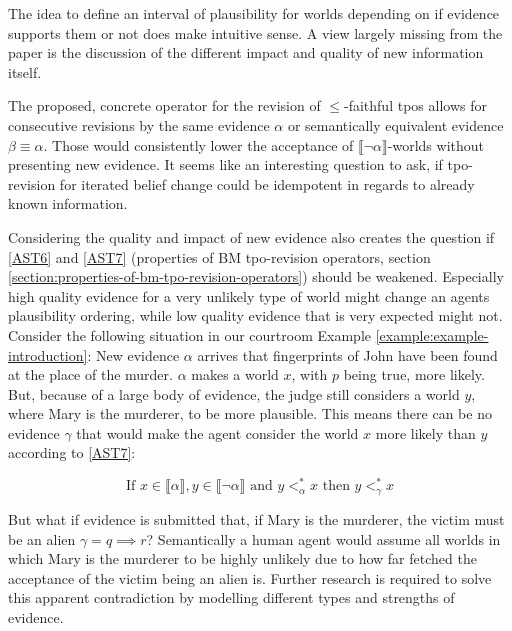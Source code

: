 \documentclass[english, 12pt]{scrartcl}
\theoremstyle{definition}
\theoremstyle{definition}
\theoremstyle{definition}
\newcommand{\modelsOf}[1]{\llbracket #1 \rrbracket}
\begin{document}
The idea to define an interval of plausibility for worlds depending on if evidence supports them or not does make intuitive sense. A view largely missing from the paper is the discussion of the different impact and quality of new information itself.

The proposed, concrete operator for the revision of $\leq$-faithful tpos allows for consecutive revisions by the same evidence $\alpha$ or semantically equivalent evidence $\beta \equiv \alpha$. Those would consistently lower the acceptance of $\modelsOf{\neg\alpha}$-worlds without presenting new evidence. It seems like an interesting question to ask, if tpo-revision for iterated belief change could be idempotent in regards to already known information.

Considering the quality and impact of new evidence also creates the question if \ref{AST6} and \ref{AST7} (properties of BM tpo-revision operators, section \ref{section:properties-of-bm-tpo-revision-operators}) should be weakened. Especially high quality evidence for a very unlikely type of world might change an agents plausibility ordering, while low quality evidence that is very expected might not. Consider the following situation in our courtroom Example \ref{example:example-introduction}: New evidence $\alpha$ arrives that fingerprints of John have been found at the place of the murder. $\alpha$  makes a world $x$, with $p$ being true, more likely. But, because of a large body of evidence, the judge still considers a world $y$, where Mary is the murderer, to be more plausible. This means there can be no evidence $\gamma$ that would make the agent consider the world $x$ more likely than $y$ according to \ref{AST7}:

\begin{equation*}
    \textrm{If } x \in \modelsOf{\alpha}, y \in \modelsOf{\neg\alpha} \textrm{ and } y <_{\alpha}^{\ast} x \textrm{ then } y <_{\gamma}^{\ast} x
\end{equation*}

But what if evidence is submitted that, if Mary is the murderer, the victim must be an alien $\gamma = q \implies r$? Semantically a human agent would assume all worlds in which Mary is the murderer to be highly unlikely due to how far fetched the acceptance of the victim being an alien is. Further research is required to solve this apparent contradiction by modelling different types and strengths of evidence.

\newpage

\typeout{}


\end{document}
